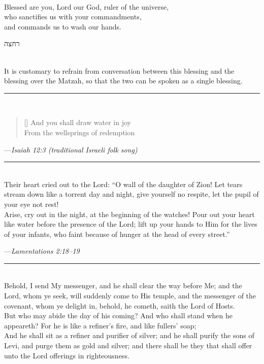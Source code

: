 \documentclass[a4paper,10pt,openany]{memoir}
\newcommand{\HgSource}[1]{\hfill{\small---\itshape{#1}}}
\newcommand{\hchapter}[1]{
  \begin{hebrew}
    \begin{Spacing}{.97}
      \newpage
      \strut

      \vspace{.15em}

      \begin{flushleft}
      \noindent\Huge #1
      \end{flushleft}

      \vspace{1em}
    \end{Spacing}
  \end{hebrew}
}
\newcommand{\HgFill}{\vfill \hrule \vfill}
\newenvironment{HgEnglish}{\strut\\\noindent}{\vspace{1em}}
\newcommand{\LSrc}{\textsuperscript{\upshape{[L]}}}
\begin{document}
\begin{HgEnglish}
  Blessed are you, Lord our God, ruler of the universe, \\
  who sanctifies us with your commandments, \\
  and commands us to wash our hands.
\end{HgEnglish}

\vfill

\hchapter{רחצה}

\begin{HgEnglish}
It is customary to refrain from conversation between this blessing and the
blessing over the Matzah, so that the two can be spoken as a single blessing.
\end{HgEnglish}

\HgFill

\begin{HgEnglish}
  \settowidth{\versewidth}{From the wellsprings of redemption}
  \begin{verse}[\versewidth]
    And you shall draw water in joy \\
    From the wellsprings of redemption
  \end{verse}
  \HgSource{Isaiah 12:3 (traditional Israeli folk song)}
\end{HgEnglish}

\HgFill

\begin{HgEnglish}
  Their heart cried out to the Lord: ``O wall of the daughter of Zion! Let tears
  stream down like a torrent day and night, give yourself no respite, let the
  pupil of your eye not rest!\\

  \noindent Arise, cry out in the night, at the beginning of the watches! Pour out your
  heart like water before the presence of the Lord; lift up your hands to Him
  for the lives of your infants, who faint because of hunger at the
  head of every street.''
\end{HgEnglish}

\HgSource{Lamentations 2:18--19 \LSrc}

\HgFill

\begin{HgEnglish}
  Behold, I send My messenger, and he shall clear the way before Me; and the
  Lord, whom ye seek, will suddenly come to His temple, and the messenger of the
  covenant, whom ye delight in, behold, he cometh, saith the Lord of Hosts.\\

  \noindent
  But who may abide the day of his coming? And who shall stand when he
  appeareth? For he is like a refiner's fire, and like fullers' soap;\\
  
  \noindent
  And he shall sit as a refiner and purifier of silver; and he shall purify the
  sons of Levi, and purge them as gold and silver; and there shall be they that
  shall offer unto the Lord offerings in righteousness.
\end{HgEnglish}
\end{document}
